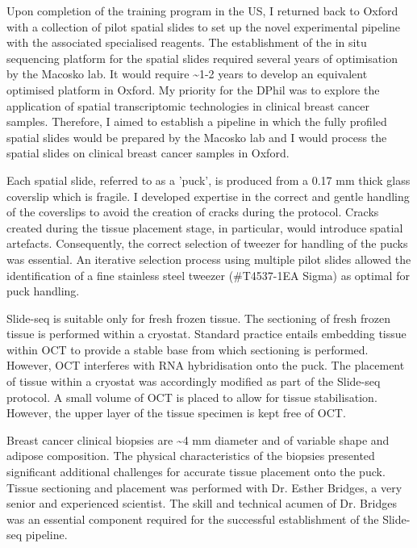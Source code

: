 Upon completion of the training program in the US, I returned back to Oxford with a collection of pilot spatial slides to set up the novel experimental pipeline with the associated specialised reagents. The establishment of the in situ sequencing platform for the spatial slides required several years of optimisation by the Macosko lab. It would require \textasciitilde 1-2 years to develop an equivalent optimised platform in Oxford. My priority for the DPhil was to explore the application of spatial transcriptomic technologies in clinical breast cancer samples. Therefore, I aimed to establish a pipeline in which the fully profiled spatial slides would be prepared by the Macosko lab and I would process the spatial slides on clinical breast cancer samples in Oxford.

Each spatial slide, referred to as a 'puck', is produced from a 0.17 mm thick glass coverslip which is fragile. I developed expertise in the correct and gentle handling of the coverslips to avoid the creation of cracks during the protocol. Cracks created during the tissue placement stage, in particular, would introduce spatial artefacts. Consequently, the correct selection of tweezer for handling of the pucks was essential. An iterative selection process using multiple pilot slides allowed the identification of a fine stainless steel tweezer (\#T4537-1EA Sigma) as optimal for puck handling.

Slide-seq is suitable only for fresh frozen tissue. The sectioning of fresh frozen tissue is performed within a cryostat. Standard practice entails embedding tissue within OCT to provide a stable base from which sectioning is performed. However, OCT interferes with RNA hybridisation onto the puck. The placement of tissue within a cryostat was accordingly modified as part of the Slide-seq protocol. A small volume of OCT is placed to allow for tissue stabilisation. However, the upper layer of the tissue specimen is kept free of OCT. 

Breast cancer clinical biopsies are \textasciitilde 4 mm diameter and of variable shape and adipose composition. The physical characteristics of the biopsies presented significant additional challenges for accurate tissue placement onto the puck. Tissue sectioning and placement was performed with Dr. Esther Bridges, a very senior and experienced scientist. The skill and technical acumen of Dr. Bridges was an essential component required for the successful establishment of the Slide-seq pipeline.


